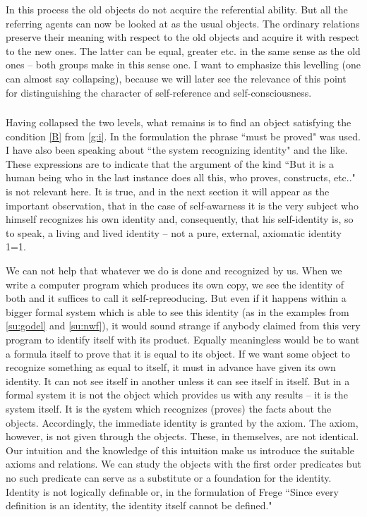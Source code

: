 In this process the old objects do not acquire the referential ability. But all the referring agents can now be
looked at as the usual objects. The ordinary relations preserve their meaning with respect to the old objects and 
acquire it with respect to the new ones. The latter can be equal, greater etc. in the same sense as the old ones -- both 
groups make in this sense one. I want to emphasize this levelling (one can almost say collapsing), because we 
will later see the relevance of this point for distinguishing the character of self-reference and self-consciousness.

\subsubsection{}\label{g:iii}
Having collapsed the two levels, what remains is to find an object satisfying the condition \ref{B} from
\ref{g:i}. In the formulation the phrase 
``must be proved" was used. I have also been speaking about ``the system recognizing identity" and the like. These 
expressions are to indicate that the argument of the kind ``But it is a human being who in the last instance does all 
this, who proves, constructs, etc.." is not relevant here. It is true, and in the next
section  it will appear as the important 
observation, that in the case of self-awarness it is the very subject who himself recognizes his own identity and, 
consequently, that his self-identity is, so to speak, a living and lived identity -- not a pure, external, axiomatic 
identity 1=1.

We can not help that whatever we do is done and recognized by us. When we write a computer program which 
produces its own copy, we see the identity of both and it suffices to call it self-repreoducing. But even if it 
happens within a bigger formal system which is able to see this identity 
(as in the examples from \ref{su:godel} and \ref{su:nwf}), it would 
sound strange if anybody claimed from this very program to identify itself with its product. Equally meaningless 
would be to want a formula itself to prove that it is equal to its object. If we want some object to recognize 
something as equal to itself, it must in advance have given its own identity. It can not see itself in another unless 
it can see itself in itself. But in a formal system it is not the object which provides us with any results -- it is the 
system itself. It is the system which recognizes (proves) the facts about the objects. Accordingly, the immediate 
identity is granted by the axiom. The axiom, however, is not given through the objects. These, in themselves, are 
not identical. Our intuition  and the knowledge of this intuition make us 
introduce the suitable 
axioms and relations. We can study the objects with the first order predicates but no such predicate can serve as a 
substitute or a foundation for the identity. Identity is not logically definable or, in the formulation of Frege ``Since every definition is an identity, the identity itself cannot be defined."

